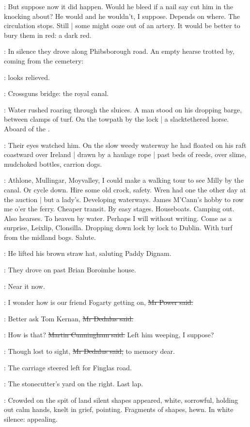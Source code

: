 \BloomInt:
But suppose now it did happen.
Would he bleed if a nail say cut him in the knocking about?
He would and he wouldn't, I suppose.
Depends on where.
The circulation stops.
Still |
some might ooze out of an artery.
It would be better to bury them in red:
a dark red.

:
In silence they drove along Phibsborough road.
An empty hearse trotted by, coming from the cemetery:

\BloomInt:
looks relieved.

\BloomInt:
Crossguns bridge:
the royal canal.

:
Water rushed roaring through the sluices.
A man stood on his
dropping barge, between clamps of turf.
On the towpath by the lock |
a slacktethered horse.
Aboard of the .

:
Their eyes watched him.
On the slow weedy waterway
he had floated on his raft coastward over Ireland |
drawn by a haulage rope |
past beds of reeds,
over slime, mudchoked bottles, carrion dogs.

\BloomInt:
Athlone, Mullingar, Moyvalley,
I could make a walking tour to see Milly by the canal.
Or cycle down.
Hire some old crock, safety.
Wren had one the other day at the auction |
but a lady's.
Developing waterways.
James M'Cann's hobby to row me o'er the ferry.
Cheaper transit.
By easy stages.
Houseboats.
Camping out.
Also hearses.
To heaven by water.
Perhaps I will without writing.
Come as a surprise, Leixlip, Clonsilla.
Dropping down lock by lock to Dublin.
With turf from the midland bogs.
Salute.

:
He lifted his brown straw hat,
saluting Paddy Dignam.

:
They drove on past Brian Boroimhe house.

\BloomInt:
Near it now.

\power:
I wonder how is our friend Fogarty getting on,
\sout{Mr Power said.}

\simon:
Better ask Tom Kernan,
\sout{Mr Dedalus said.}

\cunningham:
How is that?
\sout{Martin Cunningham said.}
Left him weeping, I suppose?

\simon:
Though lost to sight,
\sout{Mr Dedalus said,}
to memory dear.

:
The carriage steered left for Finglas road.

\BloomInt:
The stonecutter's yard on the right.
Last lap.

:
Crowded on the spit of land
silent shapes appeared,
white, sorrowful, holding out calm hands,
knelt in grief, pointing.
Fragments of shapes, hewn.
In white silence:
appealing.

